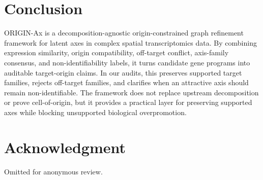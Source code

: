 \documentclass[conference]{IEEEtran}
\begin{document}
\section{Conclusion}

ORIGIN-Ax is a decomposition-agnostic origin-constrained graph refinement
framework for latent axes in complex spatial transcriptomics data. By combining
expression similarity, origin compatibility, off-target conflict, axis-family
consensus, and non-identifiability labels, it turns candidate gene programs into
auditable target-origin claims. In our audits, this preserves supported target
families, rejects off-target families, and clarifies when an attractive axis
should remain non-identifiable. The framework does not replace upstream
decomposition or prove cell-of-origin, but it provides a practical layer for
preserving supported axes while blocking unsupported biological overpromotion.

\FloatBarrier
\section*{Acknowledgment}

Omitted for anonymous review.



\end{document}
